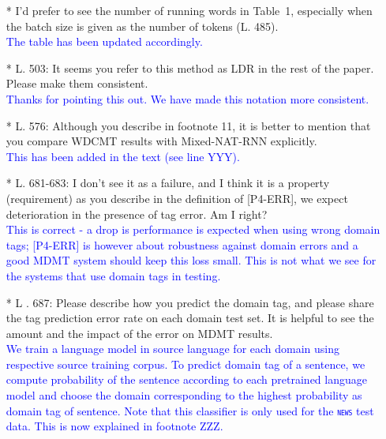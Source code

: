 \documentclass[12pt,times,a4paper,twoside]{article}
\newcommand{\fyTodo}[1]{\Todo[FY:]{\textcolor{orange}{#1}}}
\theoremstyle{definition}
\newcommand{\domain}[1]{\texttt{\textsc{#1}}}
\begin{document}
\begin{itemize}
\\
\item[*] I’d prefer to see the number of running words in Table~1, especially when the batch size is given as the number of tokens (L. 485).
  \\
  \textcolor{blue}{The table has been updated accordingly.}\fyTodo{to report number of tokens of the datasets}
\\
\item[*] L. 503: It seems you refer to this method as LDR in the rest of the paper. Please make them consistent.
\\
\textcolor{blue}{Thanks for pointing this out. We have made this notation more consistent.}
\\
\item[*] L. 576: Although you describe in footnote 11, it is better to mention that you compare WDCMT results with Mixed-NAT-RNN explicitly.
\\
\textcolor{blue}{This has been added in the text (see line YYY).}\fyTodo{to explicitly compare WDCNMT with Mixed-NAT-RNN. This is in the legend - change presentations ?}
\\
\item[*] L. 681-683: I don’t see it as a failure, and I think it is a property (requirement) as you describe in the definition of [P4-ERR], we expect deterioration in the presence of tag error. Am I right?
\\
\textcolor{blue}{This is correct - a drop is performance is expected when using wrong domain tags; [P4-ERR] is however about robustness against domain errors and a good MDMT system should keep this loss small. This is not what we see for the systems that use domain tags in testing.}

\item[* L]. 687: Please describe how you predict the domain tag, and please share the tag prediction error rate on each domain test set. It is helpful to see the amount and the impact of the error on MDMT results.
\\
\textcolor{blue}{We train a language model in source language for each domain using respective source training corpus. To predict domain tag of a sentence, we compute probability of the sentence according to each pretrained language model and choose the domain corresponding to the highest probability as domain tag of sentence. Note that this classifier is only used for the \domain{news} test data. This is now explained in footnote ZZZ.}\fyTodo{to compute error rate of domain prediction over each test set, check comment, add footnote number.}
\end{itemize}
\end{document}

